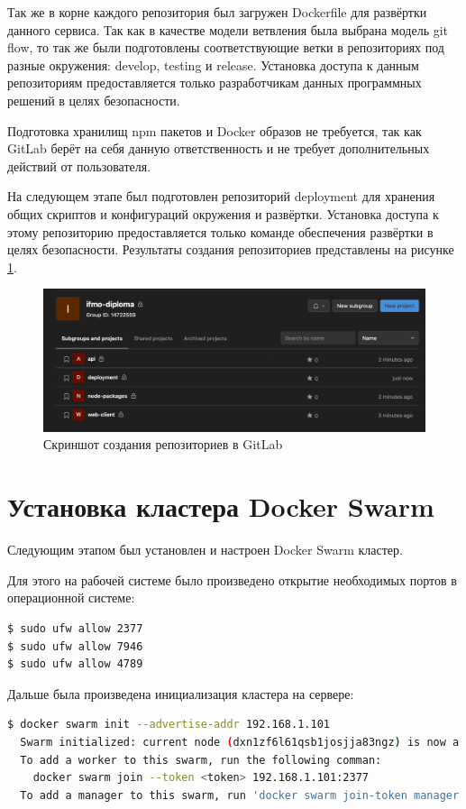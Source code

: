 Так же в корне каждого репозитория был загружен Dockerfile для развёртки данного сервиса.
Так как в качестве модели ветвления была выбрана модель git flow, то так же были подготовлены соответствующие ветки в репозиториях под разные окружения: develop, testing и release.
Установка доступа к данным репозиториям предоставляется только разработчикам данных программных решений в целях безопасности.

Подготовка хранилищ npm пакетов и Docker образов не требуется, так как GitLab берёт на себя данную ответственность и не требует дополнительных действий от пользователя.

На следующем этапе был подготовлен репозиторий deployment для хранения общих скриптов и конфигураций окружения и развёртки.
Установка доступа к этому репозиторию предоставляется только команде обеспечения развёртки в целях безопасности.
Результаты создания репозиториев представлены на рисунке \ref{fig:reps-ready}.

\begin{figure}[ht]
    \centering
    \includegraphics[scale=0.4]{src/figures/1}
    \caption{Скриншот создания репозиториев в GitLab}
    \label{fig:reps-ready}
\end{figure}

\section{Установка кластера Docker Swarm}

Следующим этапом был установлен и настроен Docker Swarm кластер.

Для этого на рабочей системе было произведено открытие необходимых портов в операционной системе\cite{linuxPocket}:
\begin{lstlisting}[language=bash,caption={Открытие портов в Linux}]
$ sudo ufw allow 2377
$ sudo ufw allow 7946
$ sudo ufw allow 4789
\end{lstlisting}

Дальше была произведена инициализация кластера на сервере:
\begin{lstlisting}[language=bash,caption={Инициализация кластера}]
$ docker swarm init --advertise-addr 192.168.1.101
  Swarm initialized: current node (dxn1zf6l61qsb1josjja83ngz) is now a manager.
  To add a worker to this swarm, run the following comman:
    docker swarm join --token <token> 192.168.1.101:2377
  To add a manager to this swarm, run 'docker swarm join-token manager' and follow the instructions.
\end{lstlisting}

